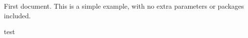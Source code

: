 \documentclass{article}
\begin{document}
First document. This is a simple example, with no 
extra parameters or packages included.

test
\end{document}
